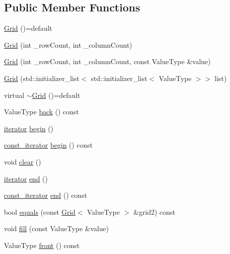 \subsection*{Public Member Functions}
\begin{DoxyCompactItemize}
\item 
\mbox{\hyperlink{classGrid_ac9458fbc282411d7bbf8806fe5a0b863}{Grid}} ()=default
\item 
\mbox{\hyperlink{classGrid_ab865eead452bcf3a84e25937153b7635}{Grid}} (int \+\_\+row\+Count, int \+\_\+column\+Count)
\item 
\mbox{\hyperlink{classGrid_a172bec01c9ecb4e2b43899fa317396a6}{Grid}} (int \+\_\+row\+Count, int \+\_\+column\+Count, const Value\+Type \&value)
\item 
\mbox{\hyperlink{classGrid_a7700c2d2dc68587062f6696625802cd8}{Grid}} (std\+::initializer\+\_\+list$<$ std\+::initializer\+\_\+list$<$ Value\+Type $>$$>$ list)
\item 
virtual \mbox{\hyperlink{classGrid_a422a4b493ffd647fcf87ff31619127ba}{$\sim$\+Grid}} ()=default
\item 
Value\+Type \mbox{\hyperlink{classGrid_a38cbd80c93f450dc9bf3ca7c6a6220bd}{back}} () const
\item 
\mbox{\hyperlink{classGrid_afc815b8f7acde11a959911c7f7222116}{iterator}} \mbox{\hyperlink{classGrid_ad69bd11391be1a1dba5c8202259664f8}{begin}} ()
\item 
\mbox{\hyperlink{classGrid_a85b414fe7dab929481b0e9d4cbc8eaed}{const\+\_\+iterator}} \mbox{\hyperlink{classGrid_a29305669b60ca1680752e2fc3592ba99}{begin}} () const
\item 
void \mbox{\hyperlink{classGrid_ac8bb3912a3ce86b15842e79d0b421204}{clear}} ()
\item 
\mbox{\hyperlink{classGrid_afc815b8f7acde11a959911c7f7222116}{iterator}} \mbox{\hyperlink{classGrid_acad38d52497a975bfb6f2f6acd76631f}{end}} ()
\item 
\mbox{\hyperlink{classGrid_a85b414fe7dab929481b0e9d4cbc8eaed}{const\+\_\+iterator}} \mbox{\hyperlink{classGrid_accf9a4bd0c34d4a5f6a7dab66ea10cdc}{end}} () const
\item 
bool \mbox{\hyperlink{classGrid_a9619d603ca957ce2be5b13198af5ee02}{equals}} (const \mbox{\hyperlink{classGrid}{Grid}}$<$ Value\+Type $>$ \&grid2) const
\item 
void \mbox{\hyperlink{classGrid_ac8f8ff1a5d0997596cbedbc2162e4649}{fill}} (const Value\+Type \&value)
\item 
Value\+Type \mbox{\hyperlink{classGrid_abaa174a9d74f7e7e38d4944fa43b5a33}{front}} () const
$$
\end{DoxyCompactItemize}
